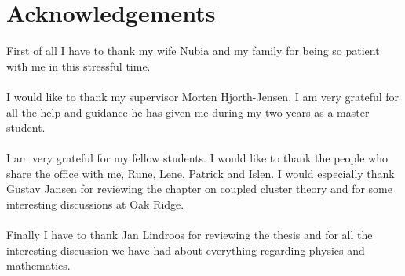 \chapter*{Acknowledgements}
First of all I have to thank my wife Nubia and my family for being so patient with me in this stressful time.\\
\\
I would like to thank my supervisor Morten Hjorth-Jensen. I am very grateful 
for all the help and guidance he has given me during my two years as a master 
student. \\
\\
I am very grateful for my fellow students. I would like to thank the people who
share the office with me, Rune, Lene, Patrick and Islen. I would especially thank Gustav Jansen for reviewing the chapter on coupled cluster theory and for 
some interesting discussions at Oak Ridge.\\
\\
Finally I have to thank Jan Lindroos for reviewing the thesis and for all the
interesting discussion we have had about everything regarding physics and 
mathematics.


